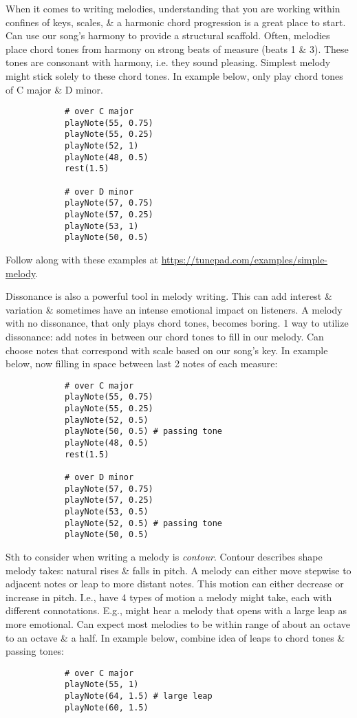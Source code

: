 \documentclass{article}
\begin{document}
\begin{itemize}
\begin{itemize}
		When it comes to writing melodies, understanding that you are working within confines of keys, scales, \& a harmonic chord progression is a great place to start. Can use our song's harmony to provide a structural scaffold. Often, melodies place chord tones from harmony on strong beats of measure (beats 1 \& 3). These tones are consonant with harmony, i.e. they sound pleasing. Simplest melody might stick solely to these chord tones. In example below, only play chord tones of C major \& D minor.
		\begin{verbatim}
			# over C major
			playNote(55, 0.75)
			playNote(55, 0.25)
			playNote(52, 1)
			playNote(48, 0.5)
			rest(1.5)
			
			# over D minor
			playNote(57, 0.75)
			playNote(57, 0.25)
			playNote(53, 1)
			playNote(50, 0.5)
		\end{verbatim}
		Follow along with these examples at \url{https://tunepad.com/examples/simple-melody}.
		
		Dissonance is also a powerful tool in melody writing. This can add interest \& variation \& sometimes have an intense emotional impact on listeners. A melody with no dissonance, that only plays chord tones, becomes boring. 1 way to utilize dissonance: add notes in between our chord tones to fill in our melody. Can choose notes that correspond with scale based on our song's key. In example below, now filling in space between last 2 notes of each measure:
		\begin{verbatim}
			# over C major
			playNote(55, 0.75)
			playNote(55, 0.25)
			playNote(52, 0.5)
			playNote(50, 0.5) # passing tone
			playNote(48, 0.5)
			rest(1.5)
			
			# over D minor
			playNote(57, 0.75)
			playNote(57, 0.25)
			playNote(53, 0.5)
			playNote(52, 0.5) # passing tone
			playNote(50, 0.5)
		\end{verbatim}
		Sth to consider when writing a melody is {\it contour}. Contour describes shape melody takes: natural rises \& falls in pitch. A melody can either move stepwise to adjacent notes or leap to more distant notes. This motion can either decrease or increase in pitch. I.e., have 4 types of motion a melody might take, each with different connotations. E.g., might hear a melody that opens with a large leap as more emotional. Can expect most melodies to be within range of about an octave to an octave \& a half. In example below, combine idea of leaps to chord tones \& passing tones:
		\begin{verbatim}
			# over C major
			playNote(55, 1)
			playNote(64, 1.5) # large leap
			playNote(60, 1.5)
			

\end{verbatim}
\end{itemize}
\end{itemize}
\end{document}
